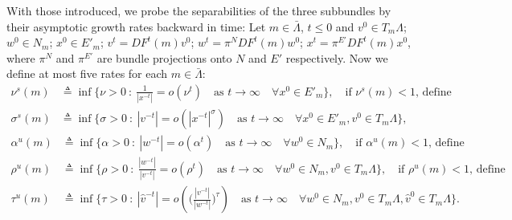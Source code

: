 \documentclass[a4paper,11pt]{article}
\theoremstyle{remark}
\begin{document}
With those introduced, we probe the separabilities of the three subbundles by their asymptotic growth rates backward in time: Let $m\in \bar{\Lambda}$, $t\le0$ and $v^0 \in T_m \Lambda$; $w^0\in N_m$; $x^0\in E'_m$; $v^t = DF^t(m)v^0$; $w^t = \pi^N DF^t(m)w^0$; $x^t = \pi^{E'}DF^t(m)x^0$,
where $\pi^N$ and $\pi^{E'}$ are bundle projections onto $N$ and $E'$ respectively.
Now we define at most five rates for each $m\in \bar{\Lambda}$:
\begin{align*}
 \nu^s(m) &\triangleq \inf \Big\{\nu>0 \: : \: \frac{1}{|x^{-t}|} = o(\nu^t) \quad \text{as $t \rightarrow \infty$} \quad \forall x^0\in E'_m\Big\}, \quad \text{if $\nu^s(m)<1$, define}\\
 \sigma^s(m) &\triangleq \inf \Big\{\sigma>0 \: : \: |v^{-t}| = o(|x^{-t}|^\sigma) \quad \text{as $t \rightarrow \infty$} \quad \forall x^0\in E'_m, v^0\in T_m\Lambda\Big\},
\end{align*}
\begin{align*}
 \alpha^u(m) &\triangleq \inf \Big\{\alpha>0 \: : \: |w^{-t}| = o(\alpha^t) \quad \text{as $t \rightarrow \infty$}\quad \forall w^0\in N_m\Big\}, \quad \text{if $\alpha^u(m)<1$, define}\\
 \rho^u(m) &\triangleq \inf \Big\{\rho>0 \: : \: \frac{|w^{-t}|}{|v^{-t}|} = o(\rho^t) \quad \text{as $t \rightarrow \infty$} \quad \forall w^0\in N_m, v^0\in T_m\Lambda\Big\},\quad \text{if $\rho^u(m)<1$, define}\\
 \tau^u(m) &\triangleq \inf \Big\{\tau>0 \: : \: |\hat{v}^{-t}| = o\left(\Big(\frac{|v^{-t}|}{|w^{-t}|}\Big)^{\tau}\right) \quad \text{as $t \rightarrow \infty$} \quad \forall w^0\in N_m, v^0\in T_m\Lambda,\hat{v}^0\in T_m\Lambda\Big\}.
\end{align*}
\end{document}
